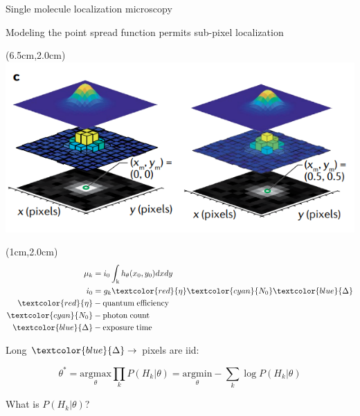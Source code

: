 \documentclass{beamer}					%
\begin{document}
\begin{frame}{Single molecule localization microscopy}

Modeling the point spread function permits sub-pixel localization 

\begin{textblock*}{8cm}(6.5cm,2.0cm)
\includegraphics[width=\textwidth]{Model.png}
\end{textblock*}

\begin{textblock*}{2cm}(1cm,2.0cm)
\begin{align*}
\mu_{k} &= i_{0}\int_{\mathrm{k}}h_{\theta}(x_{0},y_{0})dxdy\\
i_{0} &= g_{k}\textcolor{red}{\eta} \textcolor{cyan}{N_{0}}\textcolor{blue}{\Delta} 
\\
\textcolor{red}{\eta} &- \mathrm{quantum\; efficiency}\\
\textcolor{cyan}{N_{0}} &- \mathrm{photon\; count}\\
\textcolor{blue}{\Delta} &- \mathrm{exposure\; time}
\end{align*}
\end{textblock*}

\vspace{2in}

Long $\textcolor{blue}{\Delta} \rightarrow$ pixels are iid:

\begin{equation*}
\theta^{*} = \underset{\theta}{\mathrm{argmax}}\prod_{k}P(H_{k}|\theta)= \underset{\theta}{\mathrm{argmin}}-\sum_{k}\log P(H_{k}|\theta)
\end{equation*}

What is $P(H_{k}|\theta)$?

\end{frame}
\end{document}
